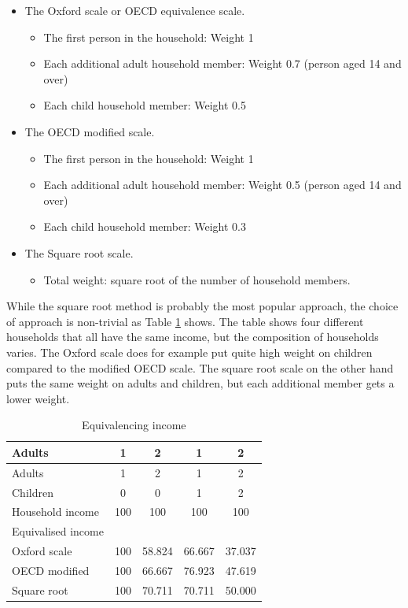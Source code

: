 \documentclass[
]{book}
\providecommand{\tightlist}{%
  \setlength{\itemsep}{0pt}\setlength{\parskip}{0pt}}
\begin{document}
\begin{itemize}
\item
  The Oxford scale or OECD equivalence scale.

  \begin{itemize}
  \tightlist
  \item
    The first person in the household: Weight 1
  \item
    Each additional adult household member: Weight 0.7 (person aged 14 and over)
  \item
    Each child household member: Weight 0.5
  \end{itemize}
\item
  The OECD modified scale.

  \begin{itemize}
  \tightlist
  \item
    The first person in the household: Weight 1
  \item
    Each additional adult household member: Weight 0.5 (person aged 14 and over)
  \item
    Each child household member: Weight 0.3
  \end{itemize}
\item
  The Square root scale.

  \begin{itemize}
  \tightlist
  \item
    Total weight: square root of the number of household members.
  \end{itemize}
\end{itemize}

While the square root method is probably the most popular approach, the choice of approach is non-trivial as Table \ref{tab:povt0} shows. The table shows four different households that all have the same income, but the composition of households varies. The Oxford scale does for example put quite high weight on children compared to the modified OECD scale. The square root scale on the other hand puts the same weight on adults and children, but each additional member gets a lower weight.

\begin{longtable}[]{@{}lcccc@{}}
\caption{\label{tab:povt0} Equivalencing income}\tabularnewline
\toprule
Adults & 1 & 2 & 1 & 2 \\
\midrule
\endfirsthead
\toprule
Adults & 1 & 2 & 1 & 2 \\
\midrule
\endhead
Children & 0 & 0 & 1 & 2 \\
Household income & 100 & 100 & 100 & 100 \\
Equivalised income & & & & \\
Oxford scale & 100 & 58.824 & 66.667 & 37.037 \\
OECD modified & 100 & 66.667 & 76.923 & 47.619 \\
Square root & 100 & 70.711 & 70.711 & 50.000 \\
\bottomrule
\end{longtable}
\end{document}
